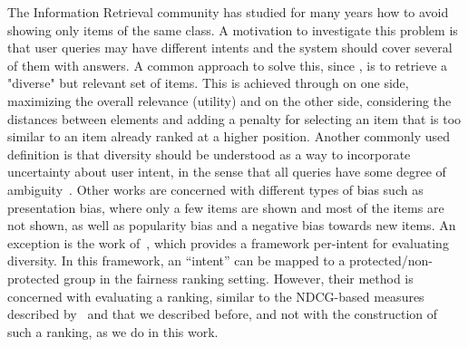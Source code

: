 The Information Retrieval community has studied for many years how to avoid showing only items of the same class. A motivation to investigate this problem is that user queries may have different intents and the system should cover several of them with answers.
%
A common approach to solve this, since \citet{carbonell1998use}, is to retrieve a "diverse" but relevant set of items. This is achieved through on one side, maximizing the overall relevance (utility) and on the other side, considering the distances between elements and adding a penalty for selecting an item that is too similar to an item already ranked at a higher position.
%
Another commonly used definition is that diversity should be understood as a way to incorporate uncertainty about user intent, in the sense that all queries have some degree of ambiguity~\cite{agrawal2009diversifying}.
%
Other works \citet{kunaver2017diversity,channamsetty2017recommender} are concerned with different types of bias such as presentation bias, where only a few items are shown and most of the items are not shown, as well as popularity bias and a negative bias towards new items.
%
An exception is the work of~\citet{sakai2011evaluating}, which provides a framework per-intent for evaluating diversity. In this framework, an ``intent'' can be mapped to a protected/non-protected group in the fairness ranking setting. However, their method is concerned with evaluating a ranking, similar to the NDCG-based measures described by~\citet{yang2016measuring} and that we described before, and not with the construction of such a ranking, as we do in this work.

